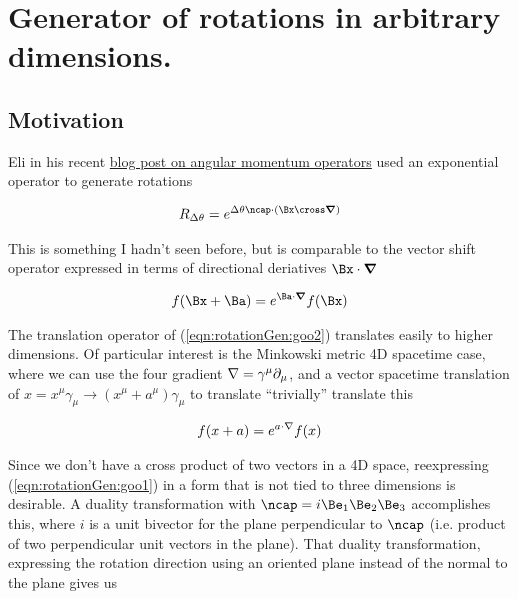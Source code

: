 

\chapter{Generator of rotations in arbitrary dimensions.}
\label{chap:rotationGenerator}
{}
\date{Aug 31, 2009}

\beginArtNoToc

\section{Motivation}

Eli in his recent \href{http://behindtheguesses.blogspot.com/2009/08/noncommuting-rotation-and-angular.html}{blog post on angular momentum operators} used an exponential operator to generate rotations

\begin{align}\label{eqn:rotationGen:goo1}
R_{\Delta\theta} = e^{\Delta\theta \ncap \cdot (\Bx \cross \spacegrad)}
\end{align}

This is something I hadn't seen before, but is comparable to the vector shift operator expressed in terms of directional deriatives $\Bx \cdot \spacegrad$

\begin{align}\label{eqn:rotationGen:goo2}
f(\Bx + \Ba) = e^{\Ba \cdot \spacegrad} f(\Bx)
\end{align}

The translation operator of (\ref{eqn:rotationGen:goo2}) translates easily to higher dimensions.  Of particular interest is the Minkowski metric 4D spacetime case, where we can use the four gradient $\nabla = \gamma^\mu \partial_\mu$, and a vector spacetime translation of $x = x^\mu \gamma_\mu \rightarrow (x^\mu + a^\mu) \gamma_\mu$ to translate ``trivially'' translate this

\begin{align}\label{eqn:rotationGen:goo3}
f(x + a) = e^{a \cdot \nabla} f(x)
\end{align}

Since we don't have a cross product of two vectors in a 4D space, reexpressing (\ref{eqn:rotationGen:goo1}) in a form that is not tied to three dimensions is desirable.  A duality transformation with $\ncap = i \Be_1 \Be_2 \Be_3$ accomplishes this, where $i$ is a unit bivector for the plane perpendicular to $\ncap$ (i.e. product of two perpendicular unit vectors in the plane).  That duality transformation, expressing the rotation direction using an oriented plane instead of the normal to the plane gives us

